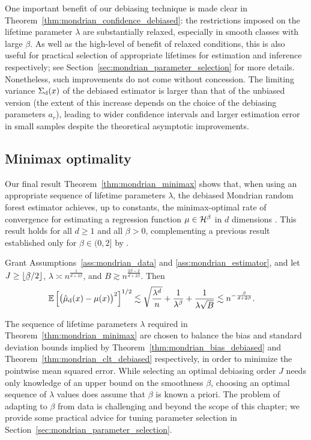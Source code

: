 One important benefit of our debiasing technique is made clear in
Theorem~\ref{thm:mondrian_confidence_debiased}: the restrictions imposed on the
lifetime
parameter $\lambda$ are substantially relaxed, especially in smooth classes
with large $\beta$. As well as the high-level of benefit of relaxed conditions,
this is also useful for practical selection of appropriate lifetimes for
estimation and inference respectively; see
Section~\ref{sec:mondrian_parameter_selection} for more details. Nonetheless,
such
improvements do not come without concession. The limiting variance
$\Sigma_{\mathrm{d}}(x)$ of the debiased estimator is larger than that of the unbiased
version (the extent of this increase depends on the choice of the debiasing
parameters $a_r$), leading to wider confidence intervals and larger estimation
error in small samples despite the theoretical asymptotic improvements.

\subsection{Minimax optimality}

Our final result Theorem~\ref{thm:mondrian_minimax} shows that,
when using an appropriate sequence of lifetime parameters $\lambda$,
the debiased Mondrian random forest estimator
achieves, up to constants, the minimax-optimal rate of convergence
for estimating a regression function $\mu \in \mathcal{H}^\beta$
in $d$ dimensions \citep{stone1982optimal}.
This result holds for all $d \geq 1$ and all $\beta > 0$,
complementing a previous result established only for $\beta \in (0, 2]$
by \citet{mourtada2020minimax}.
%
\begin{theorem}%
  \label{thm:mondrian_minimax}
  Grant Assumptions~\ref{ass:mondrian_data} and \ref{ass:mondrian_estimator},
  and let $J \geq \lfloor \flbeta / 2 \rfloor$,
  $\lambda \asymp n^{\frac{1}{d + 2 \beta}}$, and
  $B \gtrsim n^{\frac{2 \beta - 2}{d + 2 \beta}}$. Then
  \begin{align*}
    \mathbb{E} \left[
      \big( \hat \mu_{\mathrm{d}}(x) - \mu(x) \big)^2
    \right]^{1/2}
    &\lesssim
    \sqrt{\frac{\lambda^d}{n}}
    + \frac{1}{\lambda^\beta}
    + \frac{1}{\lambda \sqrt B}
    \lesssim
    n^{-\frac{\beta}{d + 2 \beta}}.
  \end{align*}
\end{theorem}

The sequence of lifetime parameters $\lambda$ required in
Theorem~\ref{thm:mondrian_minimax} are chosen to balance the bias and standard
deviation bounds implied by Theorem~\ref{thm:mondrian_bias_debiased} and
Theorem~\ref{thm:mondrian_clt_debiased} respectively, in order to minimize the
pointwise
mean squared error. While selecting an optimal debiasing order $J$ needs only
knowledge of an upper bound on the smoothness $\beta$, choosing an optimal
sequence of $\lambda$ values does assume that $\beta$ is known a priori. The
problem of adapting to $\beta$ from data is challenging and beyond the scope of
this chapter; we provide some practical advice for tuning parameter
selection in Section~\ref{sec:mondrian_parameter_selection}.

